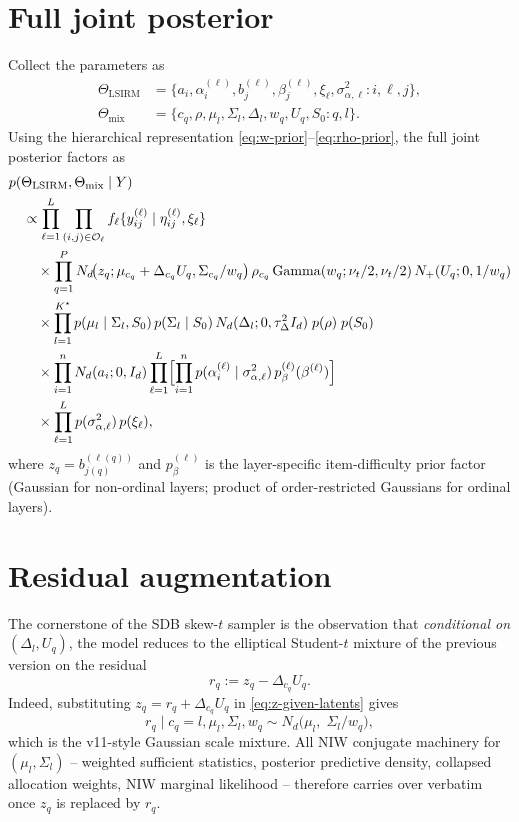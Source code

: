 \documentclass[11pt]{article}
\begin{document}
\section{Full joint posterior}

Collect the parameters as
\begin{align*}
    \Theta_{\mathrm{LSIRM}}
    &=\{a_i,\alpha_i^{(\ell)},b_j^{(\ell)},\beta_j^{(\ell)},\xi_\ell,
        \sigma_{\alpha,\ell}^2:i,\ell,j\},\\
    \Theta_{\mathrm{mix}}
    &=\{c_q,\rho,\mu_l,\Sigma_l,\Delta_l,w_q,U_q,S_0:q,l\}.
\end{align*}
Using the hierarchical representation \eqref{eq:w-prior}--\eqref{eq:rho-prior},
the full joint posterior factors as
\begin{align}
&p(\Theta_{\mathrm{LSIRM}},\Theta_{\mathrm{mix}}\mid Y)
\notag\\
&\quad\propto
\prod_{\ell=1}^L\prod_{(i,j)\in\mathcal O_\ell}
    f_\ell\{y_{ij}^{(\ell)}\mid\eta_{ij}^{(\ell)},\xi_\ell\}
\notag\\
&\qquad\times
\prod_{q=1}^P
    N_d\!\bigl(z_q;\mu_{c_q}+\Delta_{c_q}U_q,\Sigma_{c_q}/w_q\bigr)
    \,\rho_{c_q}
    \,\mathrm{Gamma}(w_q;\nu_t/2,\nu_t/2)
    \,N_+(U_q;0,1/w_q)
\notag\\
&\qquad\times
\prod_{l=1}^{K^\star}
    p(\mu_l\mid\Sigma_l,S_0)\,p(\Sigma_l\mid S_0)\,
    N_d(\Delta_l;0,\tau_\Delta^2 I_d)
    \;p(\rho)\;p(S_0)
\notag\\
&\qquad\times
\prod_{i=1}^n N_d(a_i;0,I_d)
\prod_{\ell=1}^L\Bigl[\prod_{i=1}^n p(\alpha_i^{(\ell)}\mid\sigma_{\alpha,\ell}^2)\,
    p_\beta^{(\ell)}(\beta^{(\ell)})\Bigr]
\notag\\
&\qquad\times
\prod_{\ell=1}^L p(\sigma_{\alpha,\ell}^2)\,p(\xi_\ell),
\label{eq:full-posterior}
\end{align}
where $z_q=b_{j(q)}^{(\ell(q))}$ and $p_\beta^{(\ell)}$ is the
layer-specific item-difficulty prior factor (Gaussian for non-ordinal
layers; product of order-restricted Gaussians for ordinal layers).

\section{Residual augmentation}
\label{sec:residual}

The cornerstone of the SDB skew-$t$ sampler is the observation that
\emph{conditional on} $(\Delta_l,U_q)$, the model reduces to the
elliptical Student-$t$ mixture of the previous version on the residual
\begin{equation}
    r_q:=z_q-\Delta_{c_q}U_q.
    \label{eq:residual}
\end{equation}
Indeed, substituting $z_q=r_q+\Delta_{c_q}U_q$ in
\eqref{eq:z-given-latents} gives
\begin{equation}
    r_q\mid c_q=l,\mu_l,\Sigma_l,w_q
    \sim
    N_d\!\bigl(\mu_l,\;\Sigma_l/w_q\bigr),
    \label{eq:residual-Gaussian}
\end{equation}
which is the v11-style Gaussian scale mixture.  All NIW conjugate
machinery for $(\mu_l,\Sigma_l)$ -- weighted sufficient statistics,
posterior predictive density, collapsed allocation weights, NIW marginal
likelihood -- therefore carries over verbatim once $z_q$ is replaced by
$r_q$.
\end{document}

